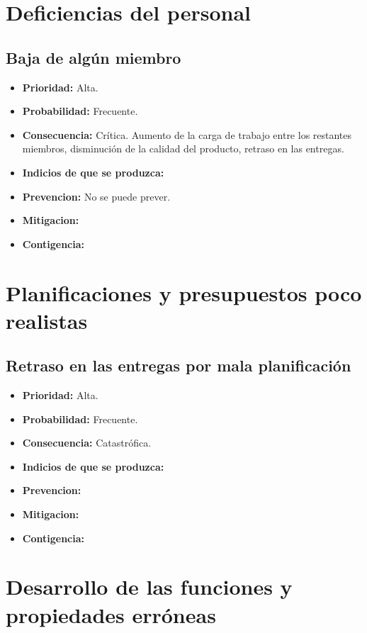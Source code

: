 \documentclass[spanish,a4paper,12pt]{report}	%
\begin{document}
\section{Deficiencias del personal}
%
\subsection*{Baja de algún miembro}			%
	\begin{itemize}
		\item \textbf {Prioridad: }Alta.
		\item \textbf {Probabilidad: }Frecuente.
		\item \textbf {Consecuencia: }Crítica. Aumento de la carga de trabajo entre los restantes miembros, disminución de la calidad del producto, retraso en las entregas.
		\item \textbf {Indicios de que se produzca: }
		\item \textbf {Prevencion: }No se puede prever.
		\item \textbf {Mitigacion: }
		\item \textbf {Contigencia: }
	\end{itemize}

%
\section{Planificaciones y presupuestos poco realistas}
\subsection*{Retraso en las entregas por mala planificación}			%
	\begin{itemize}
		\item \textbf {Prioridad: }Alta.
		\item \textbf {Probabilidad: }Frecuente.
		\item \textbf {Consecuencia: }Catastrófica.
		\item \textbf {Indicios de que se produzca: }
		\item \textbf {Prevencion: }
		\item \textbf {Mitigacion: }
		\item \textbf {Contigencia: }
	\end{itemize}

%
\section{Desarrollo de las funciones y propiedades erróneas}
\end{document}
